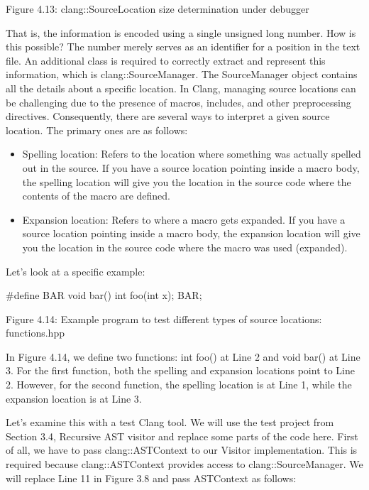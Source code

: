 \begin{center}
Figure 4.13: clang::SourceLocation size determination under debugger
\end{center}

That is, the information is encoded using a single unsigned long number. How is this possible? The number merely serves as an identifier for a position in the text file. An additional class is required to correctly extract and represent this information, which is clang::SourceManager. The SourceManager object contains all the details about a specific location. In Clang, managing source locations can be challenging due to the presence of macros, includes, and other preprocessing directives. Consequently, there are several ways to interpret a given source location. The primary ones are as follows:

\begin{itemize}
\item
Spelling location: Refers to the location where something was actually spelled out in the source. If you have a source location pointing inside a macro body, the spelling location will give you the location in the source code where the contents of the macro are defined.

\item
Expansion location: Refers to where a macro gets expanded. If you have a source location pointing inside a macro body, the expansion location will give you the location in the source code where the macro was used (expanded).
\end{itemize}

Let's look at a specific example:

\begin{cpp}
#define BAR void bar()
int foo(int x);
BAR;
\end{cpp}

\begin{center}
Figure 4.14: Example program to test different types of source locations: functions.hpp
\end{center}

In Figure 4.14, we define two functions: int foo() at Line 2 and void bar() at Line 3. For the first function, both the spelling and expansion locations point to Line 2. However, for the second function, the spelling location is at Line 1, while the expansion location is at Line 3.

Let's examine this with a test Clang tool. We will use the test project from Section 3.4, Recursive AST visitor and replace some parts of the code here. First of all, we have to pass clang::ASTContext to our Visitor implementation. This is required because clang::ASTContext provides access to clang::SourceManager. We will replace Line 11 in Figure 3.8 and pass ASTContext as follows:

